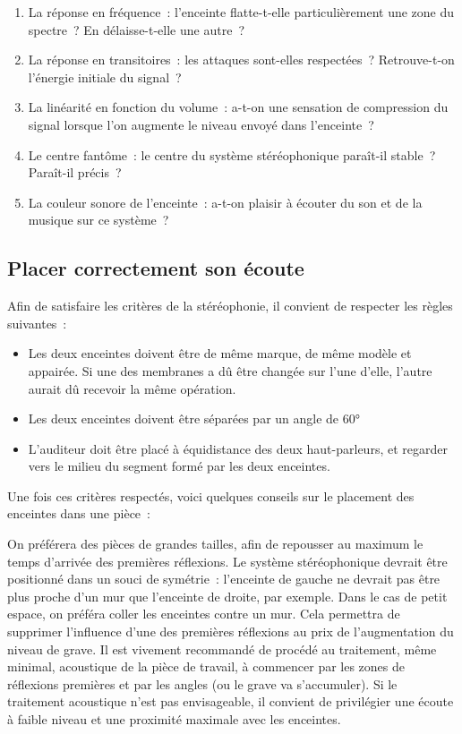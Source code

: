 \documentclass[
  letterpaper,
  DIV=11,
  numbers=noendperiod]{scrreprt}
\providecommand{\tightlist}{%
  \setlength{\itemsep}{0pt}\setlength{\parskip}{0pt}}\usepackage{longtable,booktabs,array}
\begin{document}
\begin{enumerate}
\def\labelenumi{\arabic{enumi}.}
\tightlist
\item
  La réponse en fréquence~: l'enceinte flatte-t-elle particulièrement
  une zone du spectre~? En délaisse-t-elle une autre~?
\item
  La réponse en transitoires~: les attaques sont-elles respectées~?
  Retrouve-t-on l'énergie initiale du signal~?
\item
  La linéarité en fonction du volume~: a-t-on une sensation de
  compression du signal lorsque l'on augmente le niveau envoyé dans
  l'enceinte~?
\item
  Le centre fantôme~: le centre du système stéréophonique paraît-il
  stable~? Paraît-il précis~?
\item
  La couleur sonore de l'enceinte~: a-t-on plaisir à écouter du son et
  de la musique sur ce système~?
\end{enumerate}

\hypertarget{placer-correctement-son-uxe9coute}{%
\subsection{Placer correctement son
écoute}\label{placer-correctement-son-uxe9coute}}

Afin de satisfaire les critères de la stéréophonie, il convient de
respecter les règles suivantes~:

\begin{itemize}
\tightlist
\item
  Les deux enceintes doivent être de même marque, de même modèle et
  appairée. Si une des membranes a dû être changée sur l'une d'elle,
  l'autre aurait dû recevoir la même opération.
\item
  Les deux enceintes doivent être séparées par un angle de 60°
\item
  L'auditeur doit être placé à équidistance des deux haut-parleurs, et
  regarder vers le milieu du segment formé par les deux enceintes.
\end{itemize}

Une fois ces critères respectés, voici quelques conseils sur le
placement des enceintes dans une pièce~:

On préférera des pièces de grandes tailles, afin de repousser au maximum
le temps d'arrivée des premières réflexions. Le système stéréophonique
devrait être positionné dans un souci de symétrie~: l'enceinte de gauche
ne devrait pas être plus proche d'un mur que l'enceinte de droite, par
exemple. Dans le cas de petit espace, on préféra coller les enceintes
contre un mur. Cela permettra de supprimer l'influence d'une des
premières réflexions au prix de l'augmentation du niveau de grave. Il
est vivement recommandé de procédé au traitement, même minimal,
acoustique de la pièce de travail, à commencer par les zones de
réflexions premières et par les angles (ou le grave va s'accumuler). Si
le traitement acoustique n'est pas envisageable, il convient de
privilégier une écoute à faible niveau et une proximité maximale avec
les enceintes.
\end{document}
